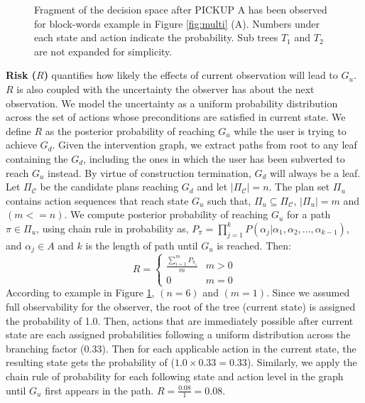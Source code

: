 \documentclass[letterpaper]{article}
\theoremstyle{plain}
\begin{document}
\begin{figure}[tb]
        \caption{Fragment of the decision space after PICKUP A has been observed for block-words example in Figure \ref{fig:multi} (A). Numbers under each state and action indicate the probability. Sub trees $T_1$ and $T_2$ are not expanded for simplicity.}
        \label{fig:feature}
\end{figure} 

\textbf{Risk ($R$)} quantifies how likely the effects of current observation will lead to $G_u$. $R$ is also coupled with the uncertainty the observer has about the next observation. We model the uncertainty as a uniform probability distribution across the set of actions whose preconditions are satisfied in current state. We define $R$ as the posterior probability of reaching $G_u$ while the user is trying to achieve $G_d$. Given the intervention graph, we extract paths from root to any leaf containing the $G_d$, including the ones in which the user has been subverted to reach $G_u$ instead. By virtue of construction termination, $G_d$ will always be a leaf.
Let $\Pi_{\mathcal{C}}$ be the candidate plans reaching $G_d$ and let $\left | \Pi_{\mathcal{C}} \right |=n$. The plan set $\Pi_{u}$ contains action sequences that reach state $G_u$ such that, $\Pi_{u} \subseteq \Pi_{\mathcal{C}}$, $\left | \Pi_{u} \right |=m$ and $(m<=n)$. We compute posterior probability of reaching $G_u$ for a path $\pi \in \Pi_{u}$, using chain rule in probability as, $P_{\pi}=\prod_{j=1}^{k}P(\alpha_j|\alpha_1, \alpha_2,...,\alpha_{k-1})$, and $\alpha_{j} \in A$ and $k$ is the length of path until $G_u$ is reached. Then: 
\begin{equation*} 
R = \left\{\begin{matrix} \frac{\sum_{i=1}^{m}P_{\pi_i}}{m} & m>0\\ 0 &  m=0 \end{matrix}\right.
\end{equation*}
According to example in Figure \ref{fig:feature}, $(n=6)$ and $(m=1)$. Since we assumed full observability for the observer, the root of the tree (current state) is assigned the probability of 1.0. Then, actions that are immediately possible after current state are each assigned probabilities following a uniform distribution across the branching factor (0.33). Then for each applicable action in the current state, the resulting state gets the probability of ($1.0\times0.33=0.33$). Similarly, we apply the chain rule of probability for each following state and action level in the graph until $G_u$ first appears in the path. $R=\frac{0.08}{1}=0.08$.
\end{document}
